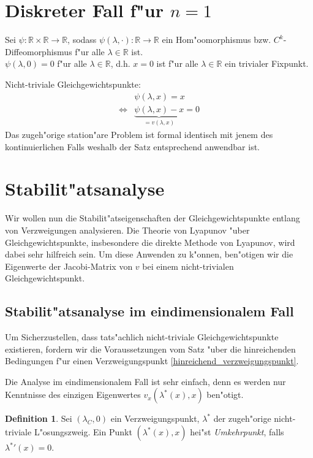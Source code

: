 \documentclass[a4paper, 13pt]{scrreprt}
\theoremstyle{definition} \newtheorem{definition}{Definition}[section]
\newcommand{\RR}{\mathbb{R}}
\begin{document}
\section{Diskreter Fall f"ur $n=1$}
Sei $\psi\colon\RR\times\RR\to\RR$, sodass $\psi(\lambda,\cdot)\colon\RR\to\RR$ ein Hom"oomorphismus bzw. $C^k$-Diffeomorphismus f"ur alle $\lambda \in \RR$ ist.
\\
$\psi(\lambda,0) = 0$ f"ur alle $\lambda\in\RR$, d.h. $x = 0$ ist f"ur alle $\lambda\in\RR$ ein trivialer Fixpunkt.

Nicht-triviale Gleichgewichtspunkte: 
\begin{align*}
&\psi(\lambda,x)=x\\
\Leftrightarrow &\underbrace{\psi(\lambda,x)-x}_{= v(\lambda,x)} = 0
\end{align*}
Das zugeh"orige station"are Problem ist formal identisch mit jenem des kontinuierlichen Falls weshalb der Satz entsprechend anwendbar ist.



\section{Stabilit"atsanalyse}
Wir wollen nun die Stabilit"atseigenschaften der Gleichgewichtspunkte entlang von Verzweigungen analysieren. Die Theorie von Lyapunov "uber Gleichgewichtspunkte, insbesondere die direkte Methode von Lyapunov, wird dabei sehr hilfreich sein. Um diese Anwenden zu k"onnen, ben"otigen wir die Eigenwerte der Jacobi-Matrix von $v$ bei einem nicht-trivialen Gleichgewichtspunkt.
\subsection{Stabilit"atsanalyse im eindimensionalem Fall}
Um Sicherzustellen, dass tats"achlich nicht-triviale Gleichgewichtspunkte existieren, fordern wir die Voraussetzungen vom Satz "uber die hinreichenden Bedingungen f"ur einen Verzweigungspunkt \eqref{hinreichend_verzweigungspunkt}.

Die Analyse im eindimensionalem Fall ist sehr einfach, denn es werden nur Kenntnisse des einzigen Eigenwertes $v_x(\lambda^*(x), x)$ ben"otigt. 

\begin{definition}
Sei $(\lambda_C,0)$ ein Verzweigungspunkt, $\lambda^*$ der zugeh"orige nicht-triviale L"osungszweig. Ein Punkt $(\lambda^*(x), x)$ hei"st \emph{Umkehrpunkt}, falls ${\lambda^*}'(x) = 0$.
\end{definition}
\end{document}
